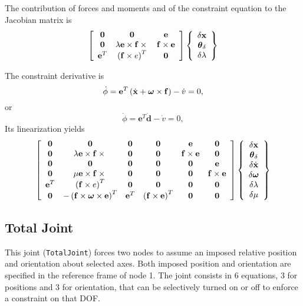 \documentclass[10pt,dvips,fleqn,subeqn]{report}
\newcommand{\T}[1]{\bm{\mathbf{#1}}}
\newcommand{\dof}{DOF}
\begin{document}
The contribution of forces and moments and of the constraint equation 
to the Jacobian matrix is
\begin{equation}
	\sqbr{\matr{ccc}{
		\T{0} & \T{0} & \T{e} \\
		\T{0} & \lambda \T{e}\times\T{f}\times{} & \T{f}\times\T{e} \\
		\T{e}^T & \plbr{\T{f}\times{e}}^T & \T{0}
	}}\cubr{\cvvect{
		\delta\T{x} \\
		\T{\theta}_{\delta} \\
		\delta\lambda
	}}
\end{equation}

The constraint derivative is
\begin{equation}
	\dot{\phi} = \T{e}^T \plbr{\dot{\T{x}} + \T{\omega}\times\T{f}} - \dot{v} = 0 ,
\end{equation}
or
\begin{equation}
	\dot{\phi} = \T{e}^T \dot{\T{d}} - \dot{v} = 0 ,
\end{equation}
Its linearization yields
\begin{equation}
	\sqbr{\matr{cccccc}{
		\T{0} & \T{0} & \T{0} & \T{0} & \T{e} & \T{0} \\
		\T{0} & \lambda \T{e}\times\T{f}\times{} & 
			\T{0} & \T{0} & \T{f}\times\T{e} & \T{0} \\
		\T{0} & \T{0} & \T{0} & \T{0} & \T{0} & \T{e} \\
		\T{0} & \mu \T{e}\times\T{f}\times{} & 
			\T{0} & \T{0} & \T{0} & \T{f}\times\T{e} \\
		\T{e}^T & \plbr{\T{f}\times{e}}^T & 
			\T{0} & \T{0} & \T{0} & \T{0} \\
		\T{0} & - \plbr{\T{f}\times\T{\omega}\times\T{e}}^T &
			\T{e}^T & \plbr{\T{f}\times\T{e}}^T & \T{0} & \T{0}
	}}\cubr{\cvvect{
		\delta\T{x} \\
		\T{\theta}_{\delta} \\
		\delta\dot{\T{x}} \\
		\delta\T{\omega} \\
		\delta\lambda \\
		\delta\mu
	}}
\end{equation}













\subsection{Total Joint}
\label{sec:TotalJoint}
This joint (\texttt{TotalJoint}) forces two nodes to assume an imposed relative
position and orientation about selected axes.
Both imposed position and orientation are specified in the reference frame
of node 1.
The joint consists in 6 equations, 3 for positions and 3 for orientation, 
that can be selectively turned on or off to enforce a constraint on that \dof.
\end{document}
